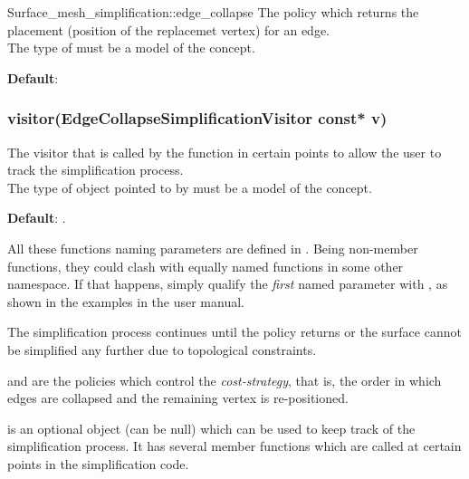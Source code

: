 \begin{ccRefFunction}{Surface_mesh_simplification::edge_collapse}
The policy which returns the placement (position of the replacemet vertex)
for an edge.\\
The type of  must be a model of the  concept.

\textbf{Default}: 

\subsubsection*{visitor(EdgeCollapseSimplificationVisitor const* v)}

The visitor that is called by the  function
in certain points to allow the user to track the simplification process.\\
The type of object pointed to by  must be a model of the  concept.

\textbf{Default}: .

All these functions naming parameters are defined in
. Being non-member functions, they could clash
with equally named functions in some other namespace. If that happens,
simply qualify the {\em first} 
named parameter with , as shown in the examples in the user manual.


The simplification process continues until the  policy returns 
or the surface cannot be simplified any further due to topological constraints.

 and  are the policies which control
the {\em cost-strategy}, that is, the order in which edges are collapsed 
and the remaining vertex is re-positioned.

 is an optional object (can be null) which can be used
to keep track of the simplification process. It has several member functions which
are called at certain points in the simplification code.

\end{ccRefFunction}



